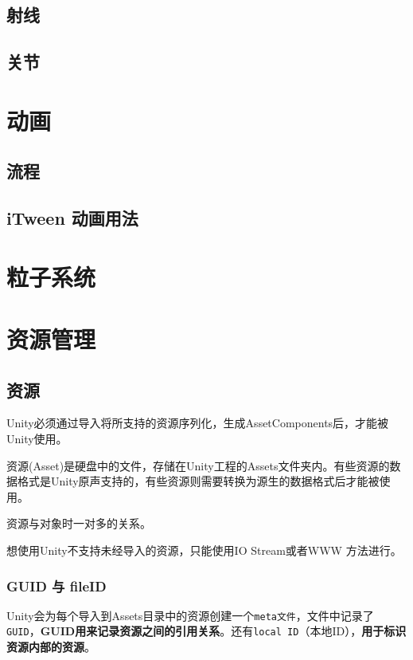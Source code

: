\documentclass[UTF8,a4paper,12pt]{ctexbook}
\begin{document}
	
	\section{射线}
	
	
	\section{关节}
		
\chapter{动画}
	\section{流程}
		
		
	
	\section{iTween 动画用法}
		

\chapter{粒子系统}

		

				
				
\chapter{资源管理}
	\section{资源}
		Unity必须通过导入将所支持的资源序列化，生成AssetComponents后，才能被Unity使用。
		
		资源(Asset)是硬盘中的文件，存储在Unity工程的Assets文件夹内。有些资源的数据格式是Unity原声支持的，有些资源则需要转换为源生的数据格式后才能被使用。
	
		资源与对象时一对多的关系。
		
		想使用Unity不支持未经导入的资源，只能使用IO Stream或者WWW 方法进行。
	
		\subsection{GUID 与 fileID}
			Unity会为每个导入到Assets目录中的资源创建一个\verb|meta文件|，文件中记录了\verb|GUID|，\textbf{GUID用来记录资源之间的引用关系}。还有\verb|local ID|（本地ID），\textbf{用于标识资源内部的资源}。
			
\end{document}
